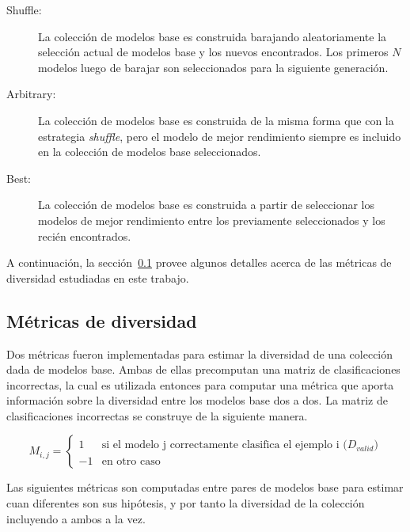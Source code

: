 \begin{description}
    \item[Shuffle:]
    La colección de modelos base es construida barajando aleatoriamente la selección actual de modelos base y los nuevos encontrados.
    Los primeros $N$ modelos luego de barajar son seleccionados para la siguiente generación.
    \item[Arbitrary:]
    La colección de modelos base es construida de la misma forma que con la estrategia \textit{shuffle}, pero el modelo de mejor rendimiento siempre es incluido en la colección de modelos base seleccionados.
    \item[Best:]
    La colección de modelos base es construida a partir de seleccionar los modelos de mejor rendimiento entre los previamente seleccionados y los recién encontrados.
\end{description}

A continuación, la sección~\ref{section:diversity-meassures} provee algunos detalles acerca de las métricas de diversidad estudiadas en este trabajo.

\subsection{Métricas de diversidad}\label{section:diversity-meassures}

Dos métricas fueron implementadas para estimar la diversidad de una colección dada de modelos base.
Ambas de ellas precomputan una matriz de clasificaciones incorrectas, la cual es utilizada entonces para computar una métrica que aporta información sobre la diversidad entre los modelos base dos a dos.
La matriz de clasificaciones incorrectas se construye de la siguiente manera.

\begin{equation}
    M_{i,j} =
    \begin{cases}
        1 & \text{si el modelo j correctamente clasifica el ejemplo i ($D_{valid}$)} \\
        -1 & \text{en otro caso}
    \end{cases}
\end{equation}

Las siguientes métricas son computadas entre pares de modelos base para estimar cuan diferentes son sus hipótesis, y por tanto la diversidad de la colección incluyendo a ambos a la vez.

